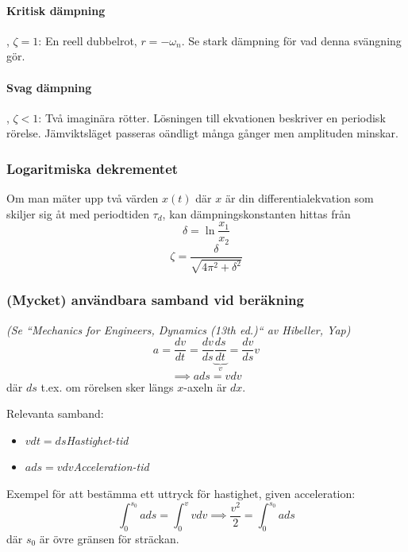 \documentclass{article}
\newenvironment{ankiflashcard}[1]{}{}
\begin{document}
\begin{paracol}{2}
\begin{ankiflashcard}{Definiera de olika typerna av dämpning. Ange hur de beter sig samt vad för typ av rötter de är kopplade till.}
\paragraph{\color{orange}Kritisk\color{black} 
 \quad dämpning}, $\zeta = 1$:
En reell dubbelrot, $r=-\omega_n$.
Se stark dämpning för vad denna svängning gör.


\paragraph{\color{green}Svag\color{black} 
 \quad dämpning}, $\zeta < 1$:
Två imaginära rötter.
Lösningen till ekvationen beskriver en periodisk rörelse. Jämviktsläget passeras oändligt många gånger men amplituden minskar.
\end{ankiflashcard}


\begin{ankiflashcard}{Definiera det logaritmiska dekrementet.}

\subsubsection{Logaritmiska dekrementet}
    
Om man mäter upp två värden $x(t)$ där $x$ är din differentialekvation som skiljer sig åt med periodtiden $\tau_d$, kan dämpningskonstanten hittas från
$$\delta = \ln \frac{x_1}{x_2}$$
$$\zeta = \frac{\delta}{\sqrt{4\pi^2 + \delta^2}}$$
\end{ankiflashcard}

\switchcolumn

\begin{ankiflashcard}{Formulera en integral för att bestämma ett uttryck för hastighet utifrån acceleration.}
\subsubsection{(Mycket) användbara samband vid beräkning}
\textit{(Se ``Mechanics for Engineers, Dynamics (13th ed.)`` av Hibeller, Yap)}
$$
a=\frac{dv}{dt}=\frac{dv}{ds}\underbrace{\frac{ds}{dt}}_{v} = \frac{dv}{ds}v
$$
$$
\implies \boxed{a ds = v dv}
$$
där $ds$ t.ex. om rörelsen sker längs $x$-axeln är $dx$.
\end{ankiflashcard}
    
\begin{ankiflashcard}{Ange Hastighet-tid, Acceleration-tid och Hastighet-position samband.}
Relevanta samband:
\begin{itemize}
    \item $vdt = ds$\quad\textit{Hastighet-tid}
    \item $ads = vdv$\quad\textit{Acceleration-tid}
\end{itemize}
Exempel för att bestämma ett uttryck för hastighet, given acceleration:
$$\int_0^{s_0} a ds = \int_0^v v dv\implies \frac{v^2}{2} = \int_0^{s_0} a ds$$
där $s_0$ är övre gränsen för sträckan.
\end{ankiflashcard}


\end{paracol}
\end{document}
